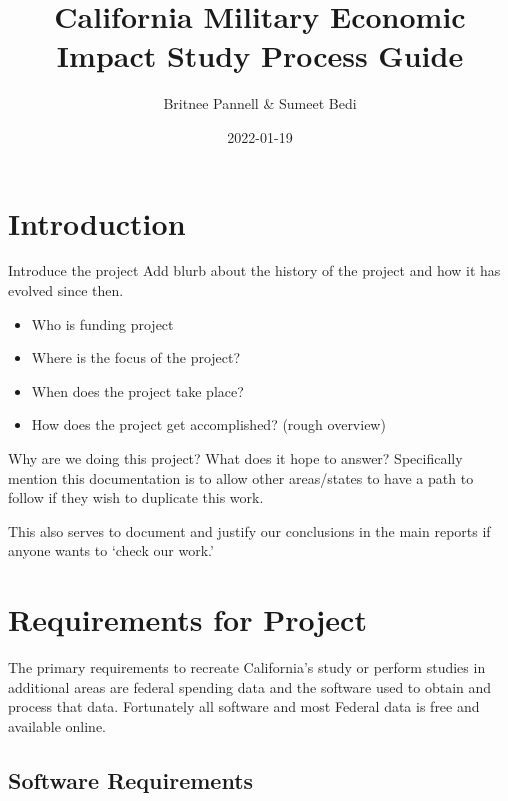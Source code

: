 \documentclass[
]{book}
\title{California Military Economic Impact Study Process Guide}
\author{Britnee Pannell \& Sumeet Bedi}
\date{2022-01-19}
\providecommand{\tightlist}{%
  \setlength{\itemsep}{0pt}\setlength{\parskip}{0pt}}
\begin{document}
\maketitle

{
\setcounter{tocdepth}{1}
\tableofcontents
}
\hypertarget{introduction}{%
\chapter{Introduction}\label{introduction}}

Introduce the project
Add blurb about the history of the project and how it has evolved since then.

\begin{itemize}
\tightlist
\item
  Who is funding project
\item
  Where is the focus of the project?
\item
  When does the project take place?
\item
  How does the project get accomplished? (rough overview)
\end{itemize}

Why are we doing this project? What does it hope to answer?
Specifically mention this documentation is to allow other areas/states to have a path to follow if they wish to duplicate this work.

This also serves to document and justify our conclusions in the main reports if anyone wants to `check our work.'

\hypertarget{requirements-for-project}{%
\chapter{Requirements for Project}\label{requirements-for-project}}

The primary requirements to recreate California's study or perform studies in additional areas are federal spending data and the software used to obtain and process that data. Fortunately all software and most Federal data is free and available online.

\hypertarget{software-requirements}{%
\section{Software Requirements}\label{software-requirements}}
\end{document}
